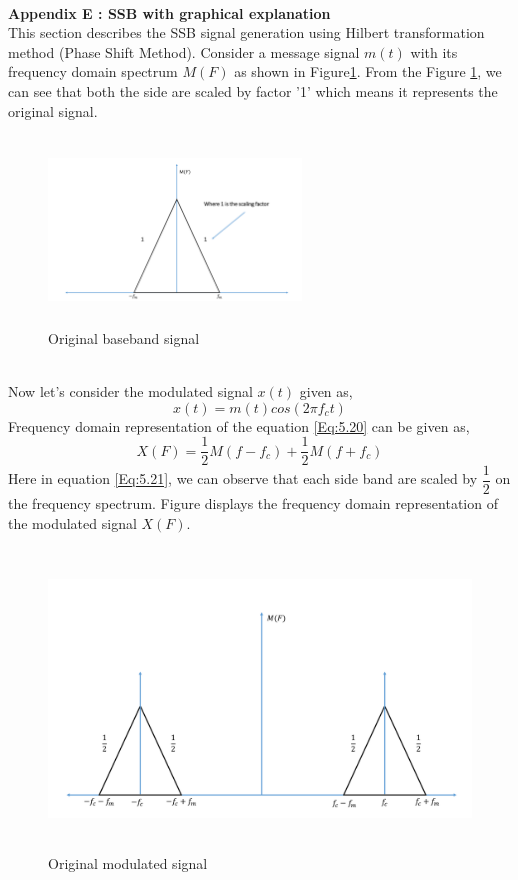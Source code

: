 \\
\textbf{Appendix E : SSB with graphical explanation}\\
This section describes the SSB signal generation using Hilbert transformation method (Phase Shift Method). Consider a message signal $m(t)$ with its frequency domain spectrum $M(F)$ as shown in Figure\ref{Original_baseband_signal}. From the Figure \ref{Original_baseband_signal}, we can see that both the side are scaled by factor '1' which means it represents the original signal.
\begin{figure}[h]
	\centering
	\includegraphics[width=0.6\textwidth, height=5cm]{./sdf/simplified_coherent_receiver/figures/SSB1.pdf}
	\caption{Original baseband signal}\label{Original_baseband_signal}
\end{figure}\\ 	
Now let's consider the modulated signal $x(t)$ given as,
\begin{equation}
x(t)=m(t) cos(2\pi f_c t)
\label{Eq:5.20}
\end{equation}
Frequency domain representation of the equation \ref{Eq:5.20} can be given as,
\begin{equation}
X(F)=\frac{1}{2}M(f-f_c)+\frac{1}{2}M(f+f_c)
\label{Eq:5.21}
\end{equation}
Here in equation \ref{Eq:5.21}, we can observe that each side band are scaled by $\dfrac{1}{2}$ on the frequency spectrum. Figure displays the frequency domain representation of the modulated signal $X(F)$.
\begin{figure}[h]
	\centering
	\includegraphics[width=1.0\textwidth, height=8cm]{./sdf/simplified_coherent_receiver/figures/SSB2.pdf}
	\caption{Original modulated signal}\label{Original_modulated_signal}
\end{figure}\\ 
